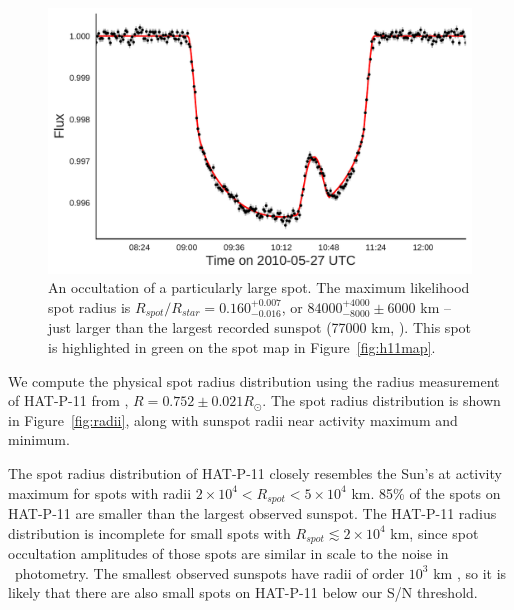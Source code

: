 \begin{figure}
\includegraphics[scale=0.45]{stsp_hat_p_11/lc_071.pdf}
\caption{An occultation of a particularly large spot. The maximum likelihood spot radius is $R_{spot}/R_{star} = 0.160_{-0.016}^{+0.007}$, or $84000^{+4000}_{-8000}\pm 6000$ km -- just larger than the largest recorded sunspot (77000 km, \citealt{Newton1955}). This spot is highlighted in green on the spot map in Figure~\ref{fig:h11map}.}
\label{fig:transit_071}
\end{figure}

We compute the physical spot radius distribution using the radius measurement of HAT-P-11 from \citet{Bakos2010}, $R=0.752 \pm 0.021 R_\odot$. The spot radius distribution is shown in Figure~\ref{fig:radii}, along with sunspot radii near activity maximum and minimum. 

The spot radius distribution of HAT-P-11 closely resembles the Sun's at activity maximum for spots with radii $2\times 10^4 < R_{spot} < 5 \times 10^4$ km. 85\% of the spots on HAT-P-11 are smaller than the largest observed sunspot. The HAT-P-11 radius distribution is incomplete for small spots with $R_{spot} \lesssim 2 \times 10^4$ km, since spot occultation amplitudes of those spots are similar in scale to the noise in \kepler\ photometry. The smallest observed sunspots have radii of order $10^3$ km \citep{Solanki2003}, so it is likely that there are also small spots on HAT-P-11 below our S/N threshold.

